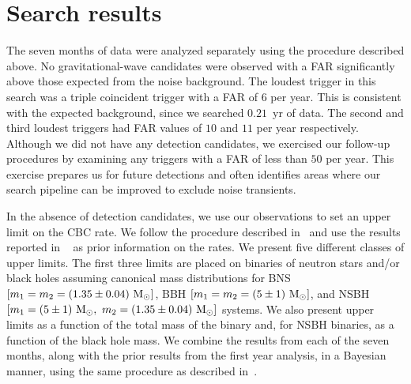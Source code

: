 \section{Search results}
\label{sec:results}

The seven months of data were analyzed separately using the procedure
described above. No gravitational-wave candidates were observed with a
\ac{FAR} significantly above those expected from the noise background.  The
loudest trigger in this search was a triple coincident trigger with a FAR of
$6$ per year. This is consistent with the expected background, since we
searched $0.21$~yr of data. The second and third loudest triggers had FAR
values of $10$ and $11$ per year respectively. Although we did not have any
detection candidates, we exercised our follow-up procedures by
examining any triggers with a \ac{FAR} of less than $50$ per year. 
This exercise prepares us for future detections and often identifies areas
where our search pipeline can be improved to exclude noise transients.

In the absence of detection candidates, we use our observations to set an
upper limit on the CBC rate. We follow the procedure described
in~\cite{Fairhurst:2007qj,loudestGWDAW03,Biswas:2007ni} 
and use the results reported in
~\cite{Collaboration:2009tt} as prior information on the rates.
We present five different classes of upper limits.  The
first three limits are placed on binaries of neutron stars and/or black
holes assuming canonical mass distributions for \ac{BNS} $[m_1 = m_2 =
(1.35\pm 0.04)~\mathrm{M_\odot}]$, \ac{BBH} $[m_1 = m_2 = (5\pm 1)~\mathrm{M_\odot}]$, and
\ac{NSBH} $[m_1 = (5\pm 1)~\mathrm{M_\odot},~m_2 = (1.35\pm 0.04)~\mathrm{M_\odot}]$ systems.
We also present upper limits as a function of the total mass of the
binary and, for \ac{NSBH} binaries, as a function of the black hole
mass. We combine the results from each of the seven
months, along with the prior results from the first year analysis, in a
Bayesian manner, using the same procedure as described
in~\cite{Collaboration:2009tt}.

